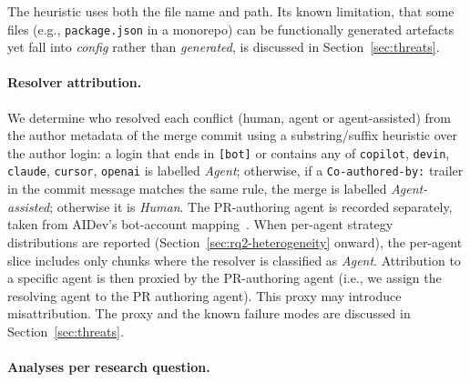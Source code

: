 \documentclass[sigconf,anonymous]{acmart}
\begin{document}
The heuristic uses both the file name and path. Its known limitation, that some files (e.g., \linebreak \texttt{package.json} in a monorepo) can be functionally generated artefacts yet fall into \emph{config} rather than \emph{generated}, is discussed in Section~\ref{sec:threats}.

\paragraph{Resolver attribution.}
\label{sec:meth-resolver}

We determine who resolved each conflict (human, agent or agent-assisted) from the author metadata of the merge commit using a substring/suffix heuristic over the author login: a login that ends in \texttt{[bot]} or contains any of \texttt{copilot}, \texttt{devin}, \texttt{claude}, \texttt{cursor}, \texttt{openai} is labelled \textit{Agent}; otherwise, if a \texttt{Co-authored-by:} trailer in the commit message matches the same rule, the merge is labelled \textit{Agent-assisted}; otherwise it is \textit{Human}. The PR-authoring agent is recorded separately, taken from AIDev's bot-account mapping~\cite{liaidev2025se3,liaidev2026}. When per-agent strategy distributions are reported (Section~\ref{sec:rq2-heterogeneity} onward), the per-agent slice includes only chunks where the resolver is classified as \textit{Agent}. Attribution to a specific agent is then proxied by the PR-authoring agent (i.e., we assign the resolving agent to the PR authoring agent). This proxy may introduce misattribution. The proxy and the known failure modes are discussed in Section~\ref{sec:threats}.

\paragraph{Analyses per research question.}
\label{sec:meth-analyses}
\end{document}
